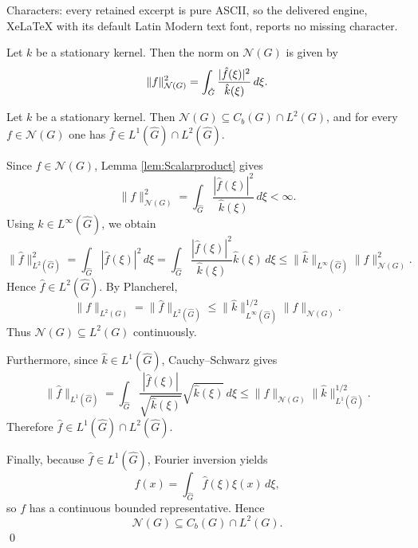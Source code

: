 \documentclass[10pt,a4paper]{amsart}
\renewcommand{\d}{\, \textup{d}}
\newenvironment{proof}{\noindent{\bf Proof:}}{\qed\medskip}
\begin{document}
Characters: every retained excerpt is pure ASCII, so the delivered engine, XeLaTeX with its default Latin Modern text font, reports no missing character.
\begin{lemma}\label{lem:Scalarproduct} 
    Let $k$ be a stationary kernel. Then the norm on $\mathcal{N}(G)$ is given by 
    \begin{align*}
        \Vert f \Vert_{\mathcal{N}(G)}^2 = \int_{\hat{G}} \frac{\vert \hat{f}(\xi)\vert^2}{\hat{k}(\xi)} \d \xi.
    \end{align*}
\end{lemma}

\begin{lemma}\label{lem:RKHSProperties}
    Let $k$ be a stationary kernel. Then $ \mathcal{N}(G) \subseteq C_b(G) \cap L^2(G)$, and for every $f \in \mathcal{N}(G)$ one has $\hat{f} \in L^1(\hat{G}) \cap L^2(\hat{G}) $. 
\end{lemma}

\begin{proof}
Since \(f\in\mathcal N(G)\), Lemma \ref{lem:Scalarproduct} gives
\[
\|f\|_{\mathcal N(G)}^2
=
\int_{\hat G}
\frac{|\hat f(\xi)|^2}{\hat k(\xi)}\,d\xi
<\infty.
\]
Using \(\hat k\in L^\infty(\hat G)\), we obtain
\[
\|\hat f\|_{L^2(\hat G)}^2
=
\int_{\hat G}|\hat f(\xi)|^2\,d\xi
=
\int_{\hat G}
\frac{|\hat f(\xi)|^2}{\hat k(\xi)}
\hat k(\xi)\,d\xi
\le
\|\hat k\|_{L^\infty(\hat G)}
\|f\|_{\mathcal N(G)}^2.
\]
Hence \(\hat f\in L^2(\hat G)\). By Plancherel,
\[
\|f\|_{L^2(G)}
=
\|\hat f\|_{L^2(\hat G)}
\le
\|\hat k\|_{L^\infty(\hat G)}^{1/2}
\|f\|_{\mathcal N(G)}.
\]
Thus \(\mathcal N(G)\subseteq L^2(G)\) continuously.

Furthermore, since \(\hat k\in L^1(\hat G)\), Cauchy--Schwarz gives
\[
\|\hat f\|_{L^1(\hat G)}
=
\int_{\hat G}
\frac{|\hat f(\xi)|}{\sqrt{\hat k(\xi)}}
\sqrt{\hat k(\xi)}\,d\xi
\le
\|f\|_{\mathcal N(G)}
\|\hat k\|_{L^1(\hat G)}^{1/2}.
\]
Therefore \(\hat f\in L^1(\hat G)\cap L^2(\hat G)\).

Finally, because \(\hat f\in L^1(\hat G)\), Fourier inversion yields
\[
f(x)=\int_{\hat G}\hat f(\xi)\xi(x)\,d\xi,
\]
so \(f\) has a continuous bounded representative. Hence
\[
\mathcal N(G)\subseteq C_b(G)\cap L^2(G).
\]
\end{proof}
\end{document}
